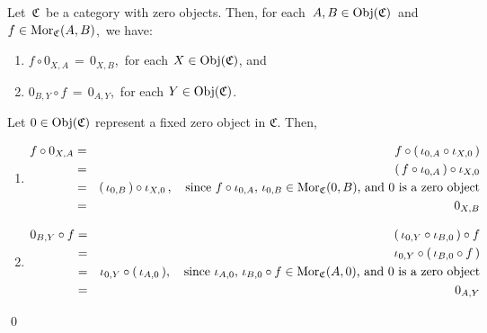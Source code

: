 
\vskip 0.5cm
\begin{lemma}
\mbox{}
\vskip 0.15cm
\noindent
Let \,$\mathfrak{C}$\, be a category with zero objects.
Then, for each \,$A, B \in \textnormal{Obj}(\mathfrak{C})$\, and \,$f \in \textnormal{Mor}_{\mathfrak{C}}(A,B)$,\, we have:
\begin{enumerate}
\item
	$f \circ 0_{X,A} \,=\, 0_{X,B}$,\, for each $X \in \textnormal{Obj}(\mathfrak{C})$, and
\item
	$0_{B,Y} \circ f \,=\, 0_{A,Y}$,\, for each $Y \in \textnormal{Obj}(\mathfrak{C})$.
\end{enumerate}
\end{lemma}
\proof
Let $0 \in \textnormal{Obj}(\mathfrak{C})$ represent a fixed zero object in $\mathfrak{C}$.
Then,
\begin{enumerate}
\item
	\begin{eqnarray*}
	f \circ 0_{X,A}
	& = &
		f \circ (\,\iota_{0,A} \circ \iota_{X,0}\,)
	\\
	& = &
		(\,f \circ \iota_{0,A}\,) \circ \iota_{X,0}
	\\
	& = &
		(\,\iota_{0,B}\,) \circ \iota_{X,0}\,,
		\quad
		\textnormal{since $f \circ \iota_{0,A},\, \iota_{0,B} \in \textnormal{Mor}_{\mathfrak{C}}(0,B)$, and $0$ is a zero object}
	\\
	& = &
		0_{X,B}
	\end{eqnarray*}
\item
	\begin{eqnarray*}
	0_{B,Y} \circ f
	& = &
		(\,\iota_{0,Y} \circ \iota_{B,0}\,) \circ f
	\\
	& = &
		\iota_{0,Y} \circ (\,\iota_{B,0} \circ f\,)
	\\
	& = &
		\iota_{0,Y} \circ (\,\iota_{A,0}\,),
		\quad
		\textnormal{since $\iota_{A,0},\, \iota_{B,0} \circ f \in \textnormal{Mor}_{\mathfrak{C}}(A,0)$, and $0$ is a zero object}
	\\
	& = &
		0_{A,Y}
	\end{eqnarray*}
\end{enumerate}
\qed


